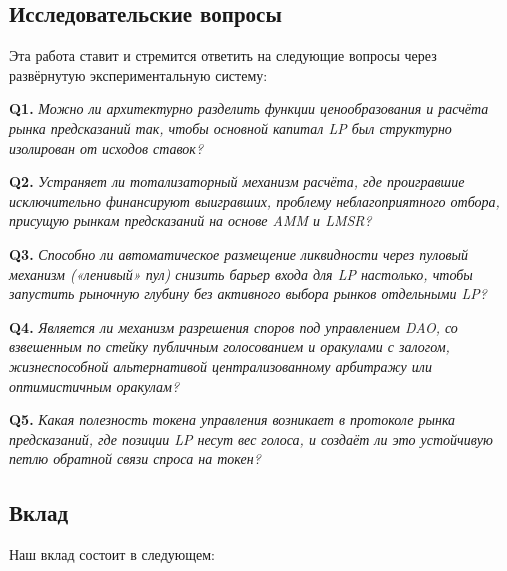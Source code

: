 \documentclass{ledger}
\theoremstyle{plain}
\theoremstyle{remark}
\begin{document}
\subsection{Исследовательские вопросы}

Эта работа ставит и стремится ответить на следующие вопросы через развёрнутую
экспериментальную систему:

\textbf{Q1.} \emph{Можно ли архитектурно разделить функции ценообразования и
расчёта рынка предсказаний так, чтобы основной капитал LP был структурно
изолирован от исходов ставок?}

\textbf{Q2.} \emph{Устраняет ли тотализаторный механизм расчёта, где проигравшие
исключительно финансируют выигравших, проблему неблагоприятного отбора, присущую
рынкам предсказаний на основе AMM и LMSR?}

\textbf{Q3.} \emph{Способно ли автоматическое размещение ликвидности через
пуловый механизм («ленивый» пул) снизить барьер входа для LP настолько, чтобы
запустить рыночную глубину без активного выбора рынков отдельными LP?}

\textbf{Q4.} \emph{Является ли механизм разрешения споров под управлением DAO, со
взвешенным по стейку публичным голосованием и оракулами с залогом, жизнеспособной
альтернативой централизованному арбитражу или оптимистичным оракулам?}

\textbf{Q5.} \emph{Какая полезность токена управления возникает в протоколе рынка
предсказаний, где позиции LP несут вес голоса, и создаёт ли это устойчивую петлю
обратной связи спроса на токен?}

\subsection{Вклад}

Наш вклад состоит в следующем:
\end{document}
